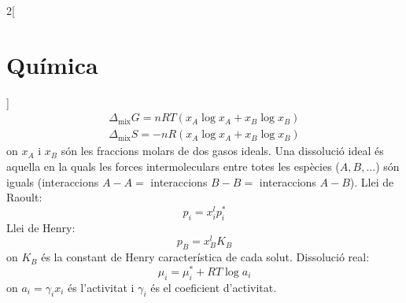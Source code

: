 \documentclass[class=article,10pt,crop=false]{standalone}
\begin{document}
\begin{multicols}{2}[\section{Química}]
\begin{gather*}
    \Delta_\text{mix}G=nRT(x_A\log x_A+x_B\log x_B)\\
    \Delta_\text{mix}S=-nR(x_A\log x_A+x_B\log x_B)
\end{gather*} {\footnotesize on $x_A$ i $x_B$ són les fraccions molars de dos gasos ideals.}\newline
Una dissolució ideal és aquella en la quals les forces intermoleculars entre totes les espècies ($A, B,\ldots$) són iguals (interaccions $A-A=$ interaccions $B-B=$ interaccions $A-B$).\newline
Llei de Raoult: $$p_i=x_i^lp_i^*$$
Llei de Henry: $$p_B=x_B^lK_B$$ {\footnotesize on $K_B$ és la constant de Henry característica de cada solut.}\newline
Dissolució real: $$\mu_i=\mu_i^*+RT\log a_i$$ {\footnotesize on $a_i=\gamma_ix_i$ és l'activitat i $\gamma_i$ és el coeficient d'activitat.}

\end{multicols}
\end{document}
